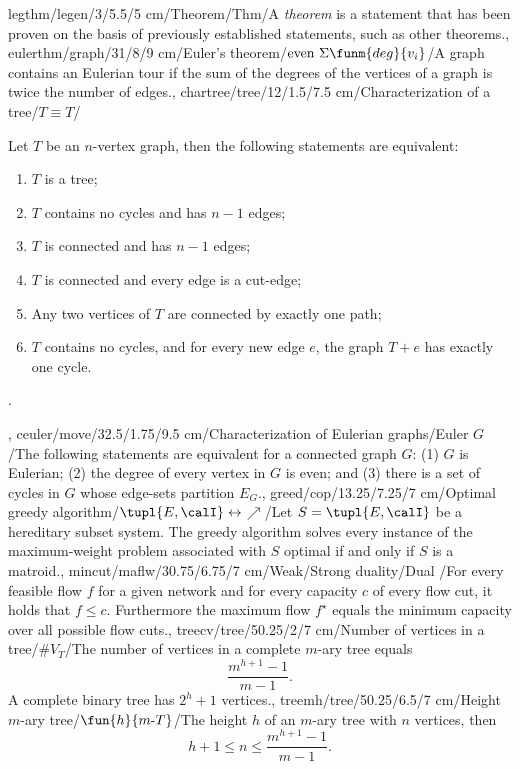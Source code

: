 legthm/legen/3/5.5/5 cm/Theorem/Thm/{A \emph{theorem} is a statement that has been proven on the basis of previously established statements, such as other theorems.},
eulerthm/graph/31/8/9 cm/{Euler's theorem}/$\mbox{even}\ \Sigma{\funm{deg}{v_i}}$/{A graph contains an Eulerian tour if the sum of the degrees of the vertices of a graph is twice the number of edges.},
chartree/tree/12/1.5/7.5 cm/{Characterization of a tree}/{$T\equiv T$}/{Let $T$ be an $n$-vertex graph, then the following statements are equivalent:\begin{enumerate}\item $T$ is a tree; \item $T$ contains no cycles and has $n-1$ edges; \item $T$ is connected and has $n-1$ edges; \item $T$ is connected and every edge is a cut-edge; \item Any two vertices of $T$ are connected by exactly one path; \item $T$ contains no cycles, and for every new edge $e$, the graph $T+e$ has exactly one cycle.\end{enumerate}.},
ceuler/move/32.5/1.75/9.5 cm/{Characterization of Eulerian graphs}/{Euler $G$}/{The following statements are equivalent for a connected graph $G$: (1) $G$ is Eulerian; (2) the degree of every vertex in $G$ is even; and (3) there is a set of cycles in $G$ whose edge-sets partition $E_G$.},
greed/cop/13.25/7.25/7 cm/{Optimal greedy algorithm}/{$\tupl{E,\calI}\leftrightarrow$\textdollaroldstyle$\nearrow$}/{Let $S=\tupl{E,\calI}$ be a hereditary subset system. The greedy algorithm solves every instance of the maximum-weight problem associated with $S$ optimal if and only if $S$ is a matroid.},
mincut/maflw/30.75/6.75/7 cm/{Weak/Strong duality}/{Dual \watertap}/{For every feasible flow $f$ for a given network and for every capacity $c$ of every flow cut, it holds that $f\leq c$. Furthermore the maximum flow $f^{\star}$ equals the minimum capacity over all possible flow cuts.},
treecv/tree/50.25/2/7 cm/{Number of vertices in a tree}/{$\#V_T$}/{The number of vertices in a complete $m$-ary tree equals\[\dfrac{m^{h+1}-1}{m-1}.\] A complete binary tree has $2^h+1$ vertices.},
treemh/tree/50.25/6.5/7 cm/{Height $m$-ary tree}/{$\fun{h}{m\mbox{-}T}$}/{The height $h$ of an $m$-ary tree with $n$ vertices, then \[h+1\leq n\leq\dfrac{m^{h+1}-1}{m-1}.\]}